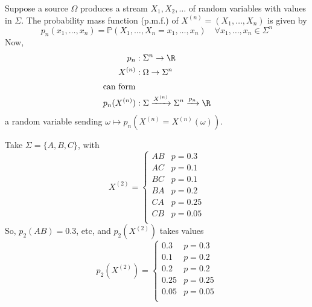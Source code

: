 \documentclass{article}
\newcommand{\Prob}{\mathbb{P}}
\newcommand{\1}[1]{\mathbbm{1}_{#1}}
\begin{document}
Suppose a source $\Omega$ produces a stream $X_1, X_2, \dotsc$ of random variables with values in $\Sigma$.
The probability mass function (p.m.f.) of $X^{(n)} = (X_1, \dotsc, X_n)$ is given by
\begin{equation*}p_n(x_1, \dotsc, x_n) = \Prob(X_1, \dotsc, X_n = x_1, \dotsc, x_n) \quad \forall x_1, \dotsc, x_n \in \Sigma^n\end{equation*}
Now,
\begin{align*}
    p_n &: \Sigma^n \to \R \\
    X^{(n)} &: \Omega \to \Sigma^n\\
    \shortintertext{can form}
    p_n(X^{(n)})&: \Sigma \xrightarrow{X^{(n)}} \Sigma^n \xrightarrow{p_n} \R
\end{align*}
a random variable sending $\omega \mapsto p_n(X^{(n)} = X^{(n)} (\omega))$.
\begin{eg}
    Take $\Sigma = \{A, B, C\}$, with
    \begin{equation*}
        X^{(2)} =
        \begin{cases}
            AB & p=0.3 \\
            AC & p=0.1 \\
            BC & p=0.1 \\
            BA & p=0.2 \\
            CA & p=0.25 \\
            CB & p=0.05 \\
        \end{cases}
    \end{equation*}
    So, $p_2(AB) = 0.3$, etc, and $p_2(X^{(2)})$ takes values
    \begin{equation*}
        p_2(X^{(2)}) =
        \begin{cases}
            0.3 & p=0.3 \\
            0.1 & p=0.2 \\
            0.2 & p=0.2 \\
            0.25 & p=0.25 \\
            0.05 & p=0.05 \\
        \end{cases}
    \end{equation*}
\end{eg}

\end{document}
